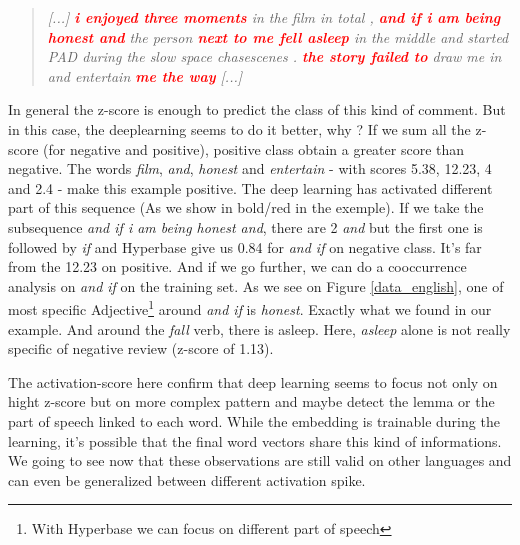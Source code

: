 \begin{quote}
\textit{[...] \textcolor{red}{\textbf{i enjoyed three moments}} in the film in total , \textcolor{red}{\textbf{and if i am being honest and}} the person \textcolor{red}{\textbf{next to me fell asleep}} in the middle and started PAD during the slow space chasescenes . \textcolor{red}{\textbf{the story failed to}} draw me in and entertain \textcolor{red}{\textbf{me the way}} [...]} 
\end{quote}

In general the z-score is enough to predict the class of this kind of comment. But in this case, the deeplearning seems to do it better, why ? If we sum all the z-score (for negative and positive), positive class obtain a greater score than negative. The words \textit{film}, \textit{and}, \textit{honest} and \textit{entertain} - with scores 5.38, 12.23, 4 and 2.4 - make this example positive. The deep learning has activated different part of this sequence (As we show in bold/red in the exemple). If we take the subsequence \textit{and if i am being honest and}, there are 2 \textit{and} but the first one is followed by \textit{if} and Hyperbase give us 0.84 for \textit{and if} on negative class. It's far from the 12.23 on positive. And if we go further, we can do a cooccurrence analysis on \textit{and if} on the training set. As we see on Figure \ref{data_english}, one of most specific Adjective\footnote{With Hyperbase we can focus on different part of speech } around \textit{and if} is \textit{honest}. Exactly what we found in our example. And around the \textit{fall} verb, there is asleep. Here, \textit{asleep} alone is not really specific of negative review (z-score of 1.13). 

The activation-score here confirm that deep learning seems to focus not only on hight z-score but on more complex pattern and maybe detect the lemma or the part of speech linked to each word. While the embedding is trainable during the learning, it's possible that the final word vectors share this kind of informations. We going to see now that these observations are still valid on other languages and can even be generalized between different activation spike.

